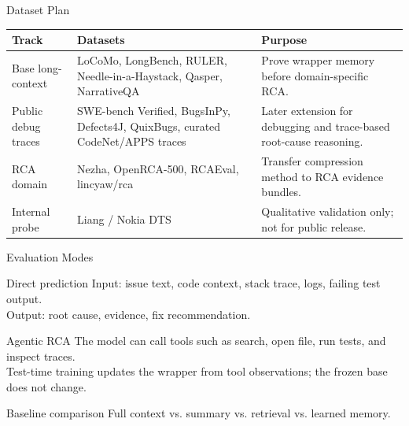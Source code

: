 \begin{frame}{Dataset Plan}
  \begin{table}
    \small
    \begin{tabular}{p{} p{} p{}}
      \toprule
      Track & Datasets & Purpose \\
      \midrule
      Base long-context & LoCoMo, LongBench, RULER, Needle-in-a-Haystack, Qasper, NarrativeQA & Prove wrapper memory before domain-specific RCA. \\
      Public debug traces & SWE-bench Verified, BugsInPy, Defects4J, QuixBugs, curated CodeNet/APPS traces & Later extension for debugging and trace-based root-cause reasoning. \\
      RCA domain & Nezha, OpenRCA-500, RCAEval, lincyaw/rca & Transfer compression method to RCA evidence bundles. \\
      Internal probe & Liang / Nokia DTS & Qualitative validation only; not for public release. \\
      \bottomrule
    \end{tabular}
  \end{table}
\end{frame}

\begin{frame}{Evaluation Modes}
  \begin{block}{Direct prediction}
    Input: issue text, code context, stack trace, logs, failing test output.\\
    Output: root cause, evidence, fix recommendation.
  \end{block}

  \begin{block}{Agentic RCA}
    The model can call tools such as search, open file, run tests, and inspect traces.\\
    Test-time training updates the wrapper from tool observations; the frozen base does not change.
  \end{block}

  \begin{block}{Baseline comparison}
    Full context vs. summary vs. retrieval vs. learned memory.
  \end{block}
\end{frame}

